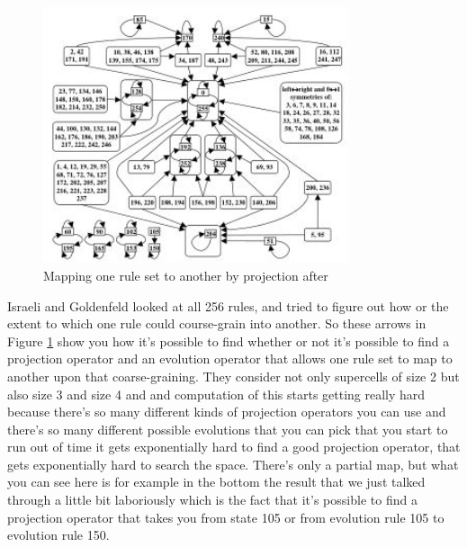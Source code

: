 \documentclass[]{article}
\begin{document}
\begin{figure}[H]
	\begin{center}
		\caption[Mapping one rule set to another by projection]{Mapping one rule set to another by projection after \cite{israeli2006coarse}}\label{fig:ig-relationships}
		\includegraphics[width=0.8\textwidth]{ig-relationships}
	\end{center}
\end{figure}
Israeli and Goldenfeld looked at all 256 rules, and  tried to figure out how or the extent to which one rule could course-grain into another.
So these arrows in Figure \ref{fig:ig-relationships} show you how it's possible
to find whether or not it's possible to find a projection operator and an evolution operator that allows one rule set to map to another upon that coarse-graining.
They consider not only supercells of size 2 but also size 3 and size 4 and
and computation of this starts getting really hard
because there's so many different kinds
of projection operators you can use
and there's so many different possible
evolutions that you can pick
that you start to run out of time
it gets exponentially hard to find a good projection operator,
that gets exponentially hard to
search the space.
There's only a partial map, but what
you can see here is for example
in the bottom the result that we just
talked through a little bit laboriously
which is the fact that it's possible
to find a projection operator
that takes you from state 105 or
from evolution rule 105 to evolution rule 150.
\end{document}
